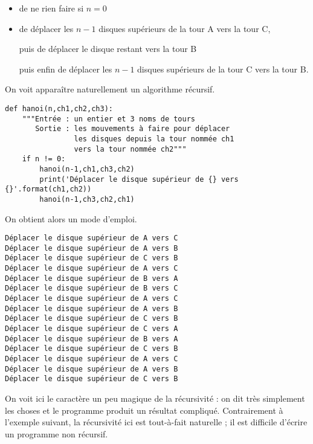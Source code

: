 \begin{itemize}
  \item de ne rien faire si $n=0$

\item de déplacer les $n-1$ disques supérieurs de la tour A vers la tour C,

 puis de déplacer le disque restant vers la tour B
 
 puis enfin  de déplacer les $n-1$ disques supérieurs de la tour C vers la tour B.
\end{itemize}
On voit apparaître naturellement un algorithme récursif.
\begin{lstlisting}
def hanoi(n,ch1,ch2,ch3):
    """Entrée : un entier et 3 noms de tours
       Sortie : les mouvements à faire pour déplacer 
                les disques depuis la tour nommée ch1 
                vers la tour nommée ch2"""
    if n != 0:
        hanoi(n-1,ch1,ch3,ch2)
        print('Déplacer le disque supérieur de {} vers {}'.format(ch1,ch2))
        hanoi(n-1,ch3,ch2,ch1)  
\end{lstlisting}
On obtient alors un mode d'emploi.
\begin{lstlisting}
Déplacer le disque supérieur de A vers C
Déplacer le disque supérieur de A vers B
Déplacer le disque supérieur de C vers B
Déplacer le disque supérieur de A vers C
Déplacer le disque supérieur de B vers A
Déplacer le disque supérieur de B vers C
Déplacer le disque supérieur de A vers C
Déplacer le disque supérieur de A vers B
Déplacer le disque supérieur de C vers B
Déplacer le disque supérieur de C vers A
Déplacer le disque supérieur de B vers A
Déplacer le disque supérieur de C vers B
Déplacer le disque supérieur de A vers C
Déplacer le disque supérieur de A vers B
Déplacer le disque supérieur de C vers B
\end{lstlisting}
On voit ici le caractère un peu magique de la récursivité : on dit très simplement les choses et le programme produit un résultat compliqué.
Contrairement à l'exemple suivant, la récursivité ici est tout-à-fait naturelle ; il est difficile d'écrire un programme non récursif.

